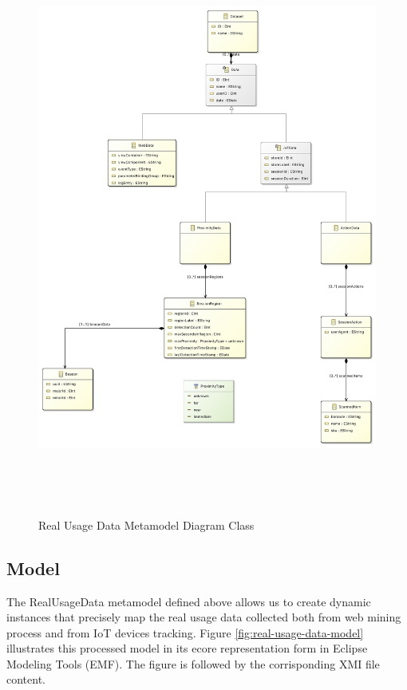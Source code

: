 \vspace{0.5cm}
\begin{figure}[H]
  \centering
    \includegraphics[height=19cm]{images/diagrams/RealUsageDataMetamodel.jpg}
  \caption{Real Usage Data Metamodel Diagram Class}
  \label{fig:real-usage-data-metamodel-diagram}
\end{figure}
\vspace{0.5cm}

\newpage
\subsection{Model}
\label{real-usage-data-model}

The RealUsageData metamodel defined above allows us to create dynamic instances that precisely map the real usage data collected both from web mining process and from IoT devices tracking. Figure \ref{fig:real-usage-data-model} illustrates this processed model in its ecore representation form in Eclipse Modeling Tools (EMF). The figure is followed by the corrisponding XMI file content.

